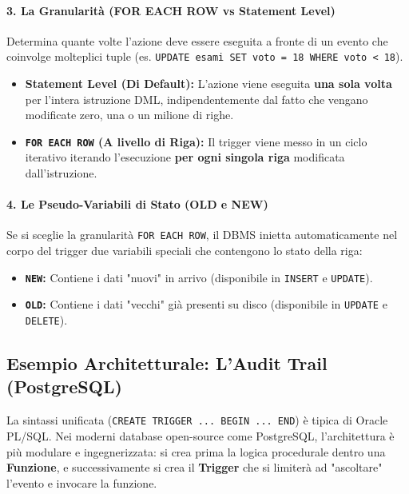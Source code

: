 \paragraph{3. La Granularità (FOR EACH ROW vs Statement Level)}
Determina quante volte l'azione deve essere eseguita a fronte di un evento che coinvolge molteplici tuple (es. \texttt{UPDATE esami SET voto = 18 WHERE voto < 18}).
\begin{itemize}
    \item \textbf{Statement Level (Di Default):} L'azione viene eseguita \textbf{una sola volta} per l'intera istruzione DML, indipendentemente dal fatto che vengano modificate zero, una o un milione di righe.
    \item \textbf{\texttt{FOR EACH ROW} (A livello di Riga):} Il trigger viene messo in un ciclo iterativo iterando l'esecuzione \textbf{per ogni singola riga} modificata dall'istruzione.
\end{itemize}

\paragraph{4. Le Pseudo-Variabili di Stato (OLD e NEW)}
Se si sceglie la granularità \texttt{FOR EACH ROW}, il DBMS inietta automaticamente nel corpo del trigger due variabili speciali che contengono lo stato della riga:
\begin{itemize}
    \item \textbf{\texttt{NEW}:} Contiene i dati "nuovi" in arrivo (disponibile in \texttt{INSERT} e \texttt{UPDATE}).
    \item \textbf{\texttt{OLD}:} Contiene i dati "vecchi" già presenti su disco (disponibile in \texttt{UPDATE} e \texttt{DELETE}).
\end{itemize}

\subsection{Esempio Architetturale: L'Audit Trail (PostgreSQL)}

\begin{warningbox}
La sintassi unificata (\texttt{CREATE TRIGGER ... BEGIN ... END}) è tipica di Oracle PL/SQL. Nei moderni database open-source come PostgreSQL, l'architettura è più modulare e ingegnerizzata: si crea prima la logica procedurale dentro una \textbf{Funzione}, e successivamente si crea il \textbf{Trigger} che si limiterà ad "ascoltare" l'evento e invocare la funzione.
\end{warningbox}

